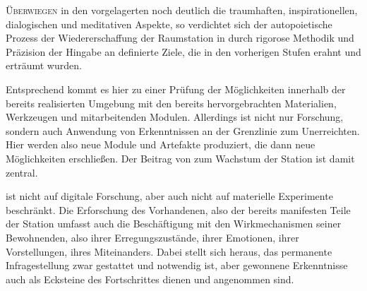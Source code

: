 \begin{newstuff}
    \lettrine{Ü}{berwiegen} in den vorgelagerten  noch deutlich die traumhaften, inspirationellen, dialogischen und meditativen Aspekte, so verdichtet sich der autopoietische Prozess der Wiedererschaffung der Raumstation in  durch rigorose Methodik und Präzision der Hingabe an definierte Ziele, die in den vorherigen Stufen erahnt und erträumt wurden.

    Entsprechend kommt es hier zu einer Prüfung der Möglichkeiten innerhalb der bereits realisierten Umgebung mit den bereits hervorgebrachten Materialien, Werkzeugen und mitarbeitenden Modulen. Allerdings ist  nicht nur Forschung, sondern auch Anwendung von Erkenntnissen an der Grenzlinie zum Unerreichten. Hier werden also neue Module und Artefakte produziert, die dann neue Möglichkeiten erschließen. Der Beitrag von  zum Wachstum der Station ist damit zentral.


     ist nicht auf digitale Forschung, aber auch nicht auf materielle Experimente beschränkt. Die Erforschung des Vorhandenen, also der bereits manifesten Teile der Station umfasst auch die Beschäftigung mit den Wirkmechanismen seiner Bewohnenden, also ihrer Erregungszustände, ihrer Emotionen, ihrer Vorstellungen, ihres Miteinanders. Dabei stellt sich heraus, das permanente Infragestellung zwar gestattet und notwendig ist, aber gewonnene Erkenntnisse auch als Ecksteine des Fortschrittes dienen und angenommen sind.


\end{newstuff}
